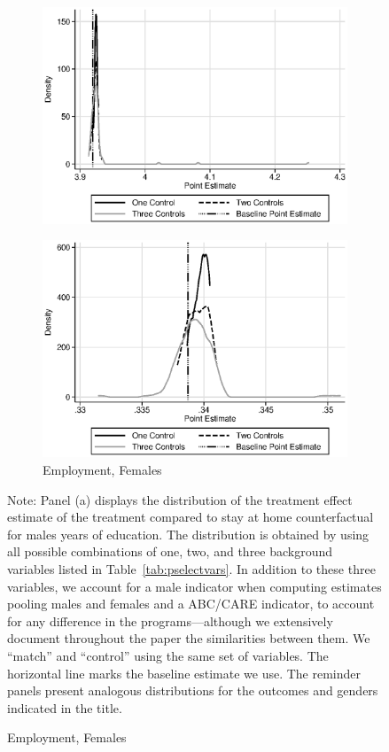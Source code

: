 \begin{figure}
\begin{subfigure}[h]{0.4\textwidth}
		\includegraphics[width=\textwidth]{output/sencontrols_female_years_30y_epan_ipw_P0.eps}
\end{subfigure}%
\begin{subfigure}[h]{0.4\textwidth}
	\centering
	\caption{Employment, Females}
		\includegraphics[width=\textwidth]{output/sencontrols_female_si30y_works_epan_ipw_P0.eps}
\end{subfigure}
\footnotesize \justify
Note: Panel (a) displays the distribution of the treatment effect estimate of the treatment compared to stay at home counterfactual for males years of education. The distribution is obtained by using all possible combinations of one, two, and three background variables listed in Table~\ref{tab:pselectvars}. In addition to these three variables, we account for a male indicator when computing estimates pooling males and females and a ABC/CARE indicator, to account for any difference in the programs---although we extensively document throughout the paper the similarities between them. We ``match'' and ``control'' using the same set of variables. The horizontal line marks the baseline estimate we use. The reminder panels present analogous distributions for the outcomes and genders indicated in the title.\\
\end{figure}

